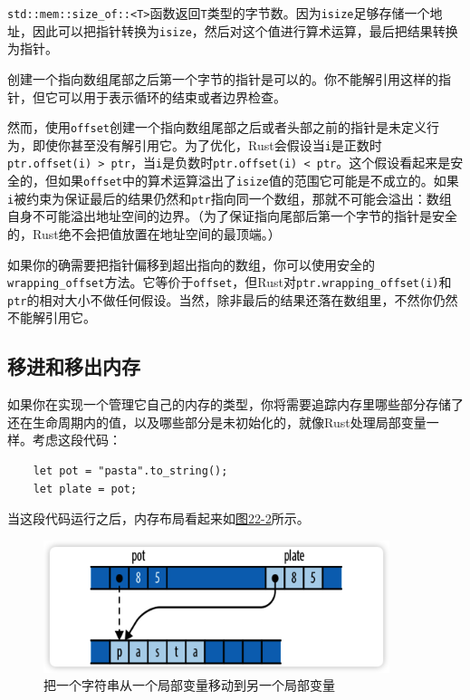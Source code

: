 \texttt{std::mem::size\_of::<T>}函数返回\texttt{T}类型的字节数。因为\texttt{isize}足够存储一个地址，因此可以把指针转换为\texttt{isize}，然后对这个值进行算术运算，最后把结果转换为指针。

创建一个指向数组尾部之后第一个字节的指针是可以的。你不能解引用这样的指针，但它可以用于表示循环的结束或者边界检查。

然而，使用\texttt{offset}创建一个指向数组尾部之后或者头部之前的指针是未定义行为，即使你甚至没有解引用它。为了优化，Rust会假设当\texttt{i}是正数时\texttt{ptr.offset(i) > ptr}，当\texttt{i}是负数时\texttt{ptr.offset(i) < ptr}。这个假设看起来是安全的，但如果\texttt{offset}中的算术运算溢出了\texttt{isize}值的范围它可能是不成立的。如果\texttt{i}被约束为保证最后的结果仍然和\texttt{ptr}指向同一个数组，那就不可能会溢出：数组自身不可能溢出地址空间的边界。（为了保证指向尾部后第一个字节的指针是安全的，Rust绝不会把值放置在地址空间的最顶端。）

如果你的确需要把指针偏移到超出指向的数组，你可以使用安全的\texttt{wrapping\_offset}方法。它等价于\texttt{offset}，但Rust对\texttt{ptr.wrapping\_offset(i)}和\texttt{ptr}的相对大小不做任何假设。当然，除非最后的结果还落在数组里，不然你仍然不能解引用它。

\subsection{移进和移出内存}
如果你在实现一个管理它自己的内存的类型，你将需要追踪内存里哪些部分存储了还在生命周期内的值，以及哪些部分是未初始化的，就像Rust处理局部变量一样。考虑这段代码：
\begin{verbatim}
    let pot = "pasta".to_string();
    let plate = pot;
\end{verbatim}

当这段代码运行之后，内存布局看起来如\hyperref[f22-2]{图22-2}所示。

\begin{figure}[htbp]
    \centering
    \includegraphics[width=0.9\textwidth]{../img/f22-2.png}
    \caption{把一个字符串从一个局部变量移动到另一个局部变量}
    \label{f22-2}
\end{figure}

